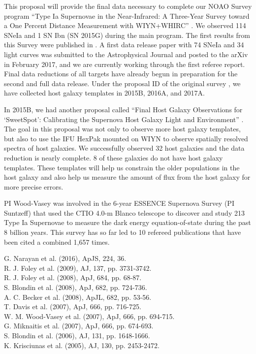 \documentclass[11pt]{article}
\begin{document}
\thepast

This proposal will provide the final data necessary to complete our NOAO Survey 
program ``Type Ia Supernovae in the Near-Infrared: A Three-Year Survey toward a One Percent Distance Measurement with WIYN+WHIRC'' .
We observed 114 SNeIa and 1 SN Ibn (SN 2015G) during the main program.
The first results from this Survey were published in \cite{weyant14}.  
A first data release paper with 74 SNeIa and 34 light curves was submitted to the Astrophysical Journal and posted to the arXiv in February 2017\cite{weyant17}, and we are currently working through the first referee report.
Final data reductions of all targets have already begun in preparation for the second and full data release.
Under the proposal ID of the original survey  , we have collected host galaxy templates in 2015B, 2016A, and 2017A.

In 2015B, we had another proposal called  ``Final Host Galaxy Observations for `SweetSpot': Calibrating the Supernova Host Galaxy Light and Environment'' .
The goal in this proposal was not only to observe more host galaxy templates, but also to use the IFU HexPak mounted on WIYN to observe spatially resolved spectra of host galaxies. 
We successfully observed 32 host galaxies and the data reduction is nearly complete. 
8 of these galaxies do not have host galaxy templates. 
These templates will help us constrain the older populations in the host galaxy and also help us measure the amount of flux from the host galaxy for more precise errors.

PI Wood-Vasey was involved in the 6-year ESSENCE Supernova Survey (PI Suntzeff) that used the CTIO 4.0-m Blanco telescope to discover and study 213 Type Ia Supernovae to measure the dark energy equation-of-state during the past 8 billion years.  This survey has so far led to 10 refereed publications that have been cited a combined 1,657 times.

G. Narayan et al. (2016), ApJS, 224, 36.  \\  %
R. J. Foley et al. (2009), AJ, 137, pp. 3731-3742.  \\  %
R. J. Foley et al. (2008), ApJ, 684, pp. 68-87.  \\  %
S. Blondin et al. (2008), ApJ, 682, pp. 724-736.  \\  %
A. C. Becker et al. (2008), ApJL, 682, pp. 53-56. \\  %
T. Davis et al. (2007), ApJ, 666, pp. 716-725.  \\  %
W. M. Wood-Vasey et al. (2007), ApJ, 666, pp. 694-715. \\  %
G. Miknaitis et al. (2007), ApJ, 666, pp. 674-693. \\  %
S. Blondin et al. (2006), AJ, 131, pp. 1648-1666. \\  %
K. Krisciunas et al. (2005), AJ, 130, pp. 2453-2472. \\  %
\end{document}
